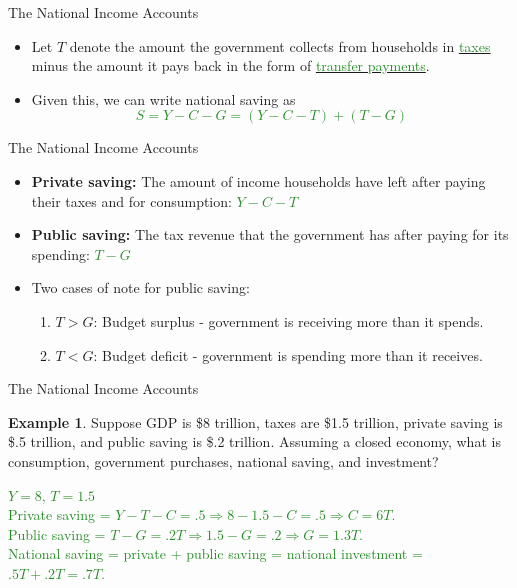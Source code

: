 \documentclass[xcolor={dvipsnames},pdf, hyperref={colorlinks=true, citecolor=ForestGreen, linkcolor=BlueViolet, urlcolor=Magenta}]{beamer}
\theoremstyle{definition}
\newtheorem{exmp}{Example}[section]
\newcommand{\defn}[1]{\textbf{#1}}
\newcommand{\ddp}[1]{{\textcolor{ForestGreen}{#1}}}
\newcommand{\dd}[1]{{\underline{\textcolor{ForestGreen}{#1}}}}
\begin{document}
\begin{frame}{The National Income Accounts}
\begin{itemize}
	\item Let $T$ denote the amount the government collects from households in \dd{taxes} minus the amount it pays back in the form of \dd{transfer payments}.
	\item Given this, we can write national saving as \ddp{\[S = Y - C - G = (Y - C - T) + (T - G)\]}
\end{itemize}
\end{frame}

\begin{frame}{The National Income Accounts}
\begin{itemize}
	\item \defn{Private saving:} The amount of income households have left after paying their taxes and for consumption: \dd{$Y - C - T$}
	\item \defn{Public saving:} The tax revenue that the government has after paying for its spending: \dd{$T - G$}
	
	\item Two cases of note for public saving:
	\begin{enumerate}
		\item $T > G$: Budget surplus - government is receiving more than it spends.
		\item $T < G$: Budget deficit - government is spending more than it receives.
	\end{enumerate}
\end{itemize}
\end{frame}

\begin{frame}{The National Income Accounts}
\begin{exmp}
	Suppose GDP is \$8 trillion, taxes are \$1.5 trillion, private saving is \$.5 trillion, and public saving is \$.2 trillion. Assuming a closed economy, what is consumption, government purchases, national saving, and investment?
\end{exmp} 
\ddp{$Y = 8$, $T = 1.5$ \\
	\pause Private saving = $Y - T - C = .5 \Rightarrow 8 - 1.5 - C = .5 \Rightarrow C = 6T$. 
	\\
	\pause Public saving = $T - G = .2T \Rightarrow 1.5 - G = .2 \Rightarrow G = 1.3T$. 
	\\
	\pause National saving = private + public saving = national investment = $.5T + .2T = .7T$.}
\end{frame}
\end{document}

